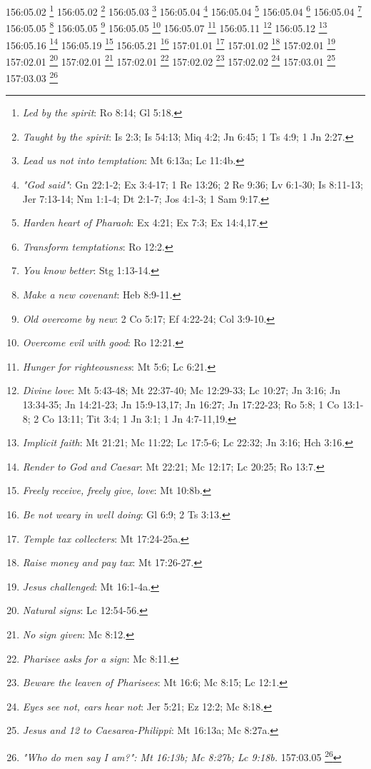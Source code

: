 {{{{{{{{{{{{{{{{{{{{{{{{{{{{{{{{156:05.02 \footnote{\textit{Led by the spirit}: Ro 8:14; Gl 5:18.}
156:05.02 \footnote{\textit{Taught by the spirit}: Is 2:3; Is 54:13; Miq 4:2; Jn 6:45; 1 Ts 4:9; 1 Jn 2:27.}
156:05.03 \footnote{\textit{Lead us not into temptation}: Mt 6:13a; Lc 11:4b.}
156:05.04 \footnote{\textit{"God said"}: Gn 22:1-2; Ex 3:4-17; 1 Re 13:26; 2 Re 9:36; Lv 6:1-30; Is 8:11-13; Jer 7:13-14; Nm 1:1-4; Dt 2:1-7; Jos 4:1-3; 1 Sam 9:17.}
156:05.04 \footnote{\textit{Harden heart of Pharaoh}: Ex 4:21; Ex 7:3; Ex 14:4,17.}
156:05.04 \footnote{\textit{Transform temptations}: Ro 12:2.}
156:05.04 \footnote{\textit{You know better}: Stg 1:13-14.}
156:05.05 \footnote{\textit{Make a new covenant}: Heb 8:9-11.}
156:05.05 \footnote{\textit{Old overcome by new}: 2 Co 5:17; Ef 4:22-24; Col 3:9-10.}
156:05.05 \footnote{\textit{Overcome evil with good}: Ro 12:21.}
156:05.07 \footnote{\textit{Hunger for righteousness}: Mt 5:6; Lc 6:21.}
156:05.11 \footnote{\textit{Divine love}: Mt 5:43-48; Mt 22:37-40; Mc 12:29-33; Lc 10:27; Jn 3:16; Jn 13:34-35; Jn 14:21-23; Jn 15:9-13,17; Jn 16:27; Jn 17:22-23; Ro 5:8; 1 Co 13:1-8; 2 Co 13:11; Tit 3:4; 1 Jn 3:1; 1 Jn 4:7-11,19.}
156:05.12 \footnote{\textit{Implicit faith}: Mt 21:21; Mc 11:22; Lc 17:5-6; Lc 22:32; Jn 3:16; Hch 3:16.}
156:05.16 \footnote{\textit{Render to God and Caesar}: Mt 22:21; Mc 12:17; Lc 20:25; Ro 13:7.}
156:05.19 \footnote{\textit{Freely receive, freely give, love}: Mt 10:8b.}
156:05.21 \footnote{\textit{Be not weary in well doing}: Gl 6:9; 2 Ts 3:13.}
157:01.01 \footnote{\textit{Temple tax collecters}: Mt 17:24-25a.}
157:01.02 \footnote{\textit{Raise money and pay tax}: Mt 17:26-27.}
157:02.01 \footnote{\textit{Jesus challenged}: Mt 16:1-4a.}
157:02.01 \footnote{\textit{Natural signs}: Lc 12:54-56.}
157:02.01 \footnote{\textit{No sign given}: Mc 8:12.}
157:02.01 \footnote{\textit{Pharisee asks for a sign}: Mc 8:11.}
157:02.02 \footnote{\textit{Beware the leaven of Pharisees}: Mt 16:6; Mc 8:15; Lc 12:1.}
157:02.02 \footnote{\textit{Eyes see not, ears hear not}: Jer 5:21; Ez 12:2; Mc 8:18.}
157:03.01 \footnote{\textit{Jesus and 12 to Caesarea-Philippi}: Mt 16:13a; Mc 8:27a.}
157:03.03 \footnote{\textit{"Who do men say I am?": Mt 16:13b; Mc 8:27b; Lc 9:18b.}
157:03.05 \footnote{\textit{"Who do you say I am?": Mt 16:15; Mc 8:29a; Lc 9:20a.}
157:03.05 \footnote{\textit{"You are the Christ": Mt 16:16; Mc 8:29b; Lc 9:20b.}
157:03.05 \footnote{\textit{Answer}: "various prophets": Mt 16:14; Mc 8:28; Lc 9:19.}
157:03.06 \footnote{\textit{Tell no man}: Mt 16:20; Mc 8:30; Lc 9:21.}
157:03.06 \footnote{\textit{This revealed by Father}: Mt 16:17.}
}}}}}}}}}}}}}}}}}}}}}}}}}}}}}}}}}}}
